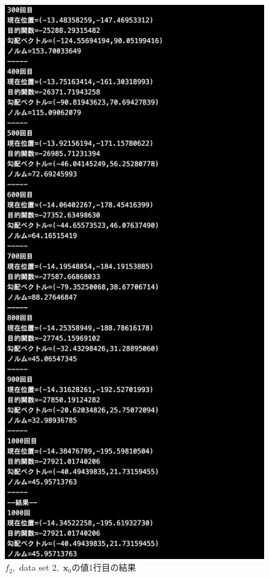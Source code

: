 \documentclass[12pt]{jarticle}
\begin{document}
\begin{figure}[h]
\begin{minipage}{0.5\hsize}
    \end{minipage}
    \begin{minipage}{0.5\hsize}
        \begin{center}
            \includegraphics[scale=0.2]{kadai1_2s_out2_1_3.png}
        \end{center}
    \end{minipage}
    \caption{$f_2$,\ data set 2,\ $\boldsymbol{x}_0$の値1行目の結果}
\end{figure}
\end{document}
